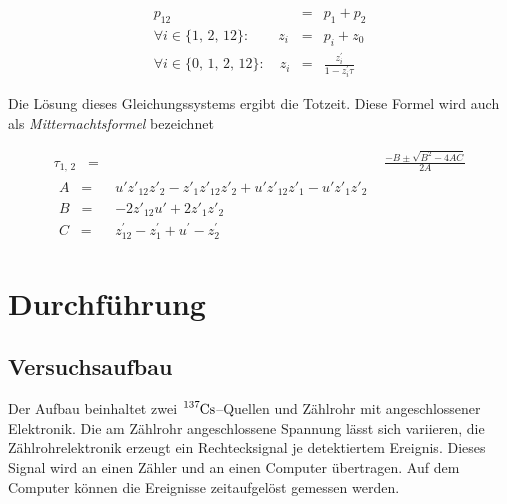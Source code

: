 \documentclass[12pt,a4paper]{scrartcl}
\numberwithin{equation}{section} %
\newcommand{\eqspaced}{\ensuremath{\;\;=\;\;}} %
\renewcommand{\[}{} %
\renewcommand{\]}{\noindent} %
\begin{document}
\begin{eqnarray}
	p_{12} &=& p_1 + p_2 \\
	\forall i\in\{1,\,2,\,12\}:\qquad
		z_i &=& p_i + z_0 \\
	\forall i\in\{0,\,1,\,2,\,12\}:\quad
		z_i &=& \frac{z^\prime_i}{1-z^\prime_i \tau}
\end{eqnarray}

\noindent
Die Lösung dieses Gleichungssystems ergibt die Totzeit. Diese Formel wird auch als \emph{Mitternachtsformel} bezeichnet

\begin{align}
	\tau _{1,\,2} \eqspaced& \frac{-B \pm \sqrt{B^2 - 4AC}}{2A} \label{eq:Totzeit Mitternachtsformel} \\
	\begin{split}
		A \eqspaced& u'z'_{12}z'_2 - z'_1z'_12z'_2 + u'z'_{12}z'_1 - u'z'_1z'_2 \\
		B \eqspaced& -2z'_{12}u' + 2z'_1z'_2 \\
		C \eqspaced& z^\prime _{12} - z^\prime _1 + u^\prime  - z^\prime _2
	\end{split}
\end{align}

\clearpage
\hypertarget{durchfuxfchrung}{%
\section{Durchführung}\label{durchfuxfchrung}}
\subsection{Versuchsaufbau}
Der Aufbau beinhaltet zwei $\ce{^{137}Cs}$--Quellen und Zählrohr mit angeschlossener Elektronik. Die am Zählrohr angeschlossene Spannung lässt sich variieren, die Zählrohrelektronik erzeugt ein Rechtecksignal je detektiertem Ereignis. Dieses Signal wird an einen Zähler und an einen Computer übertragen. Auf dem Computer können die Ereignisse zeitaufgelöst gemessen werden.
\end{document}

